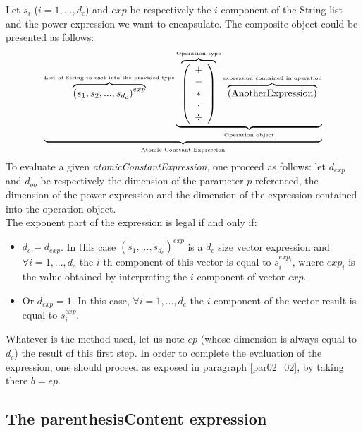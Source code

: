 \documentclass[a4paper,11pt] {article}
\begin{document}
Let $s_i$ ($i=1,...,d_c$) and $exp$ be respectively the $i$ component of the String list and the
power expression we want to encapsulate. The composite object could be presented as follows:
\begin{equation}
 \underbrace{    \overbrace{ \left( s_1  , s_2, ..., s_{d_c}\right)^{exp} }^{\mbox{\tiny List of String  to cast into the provided type}}   \underbrace{  \overbrace{\left( \begin{array}{c} + \\ - \\ \ast  \\ \cdot \\ \div   \end{array} \right) }^{\mbox{\tiny Operation type}}
 \overbrace{    \left( \mbox{AnotherExpression}\right) }^{\mbox{\tiny expression contained in operation}}   }_{\mbox{\tiny Operation object}}}_{\mbox{\tiny Atomic Constant Expression}}
\end{equation}
To evaluate a given {\it atomicConstantExpression}, one proceed as follows: let $d_{exp}$ and
$d_{oo}$ be respectively the dimension of the parameter $p$ referenced, the dimension of the power
expression and the dimension of the expression contained into the operation object.\\
The exponent part of the expression is legal if and only if:
\begin{itemize}
\item $d_c = d_{exp}$. In this case $(s_1,...,s_{d_c})^{exp}$ is a $d_c$ size vector expression and
$\forall i =1,...,d_c$ the $i$-th component of this vector is equal to $s_i^{exp_i}$, where $exp_i$
is the value obtained by interpreting the $i$ component of vector $exp$.
\item Or $d_{exp}=1$. In this case, $\forall i =1,...,d_c$ the $i$ component of the vector result is
equal to $s_i^{exp}$.\\
\end{itemize}
Whatever is the method used, let us note $ep$ (whose dimension is always equal to $d_c$) the result
of this first step.  In order to complete the evaluation of the expression, one should proceed as
exposed in paragraph \ref{par02_02}, by taking there $b=ep$.


\subsection{The parenthesisContent expression}\label{par02_04}
\end{document}
